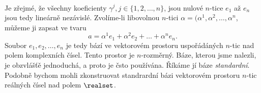 \begin{mdframed}[style=mdexam]
\begin{example}
\begin{align*}
    \end{align*}
    Je zřejmé, že všechny koeficienty \(\gamma^j, j\in\{1,2,\ldots,n\}\), jsou nulové \(n\)-tice
    \(e_1\) až \(e_n\) jsou tedy lineárně nezávislé. Zvolíme-li libovolnou \(n\)-tici
    \(\alpha=(\alpha^1, \alpha^2,\ldots, \alpha^n\), můžeme ji zapsat ve tvaru
    \begin{equation*}
      a = \alpha^1e_1 + \alpha^2e_2 + \ldots + \alpha^ne_n.
    \end{equation*}
    Soubor \(e_1, e_2, \ldots, e_n\) je tedy bází ve vektorovém prostoru uspořádáných \(n\)-tic nad
    polem komplexních čísel. Tento prostor je \(n\)-rozměrný. Báze, kterou jsme nalezli, je
    obzvlášťě jednoduchá, a proto je čsto používána. Říkáme jí báze \emph{standardní}. Podobně
    bychom mohli zkonstruovat standrardní bázi vektorovém prostoru \(n\)-tic reálných čísel nad
    polem \(\realset\).
    \endgroup
  \end{example}
\end{mdframed}